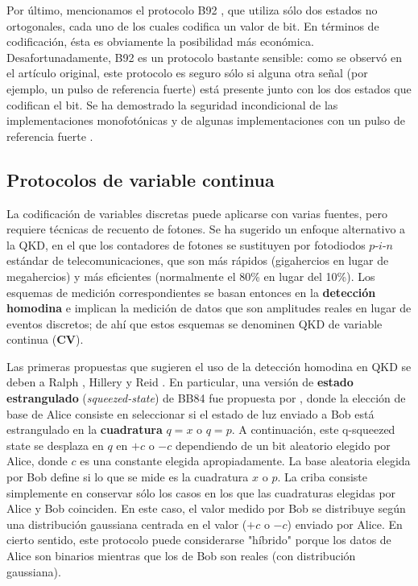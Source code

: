 \documentclass[a4paper,11pt]{book} %
\numberwithin{equation}{chapter}
\begin{document}
Por último, mencionamos el protocolo B92 \cite{bib_B92}, que utiliza sólo dos estados no ortogonales, cada uno de los cuales codifica un valor de bit. En términos de codificación, ésta es obviamente la posibilidad más económica. Desafortunadamente, B92 es un protocolo bastante sensible: como se observó en el artículo original, este protocolo es seguro sólo si alguna otra señal (por ejemplo, un pulso de referencia fuerte) está presente junto con los dos estados que codifican el bit. Se ha demostrado la seguridad incondicional de las implementaciones monofotónicas \cite{bib_B92_proof_1,bib_B92_proof_2} y de algunas implementaciones con un pulso de referencia fuerte \cite{bib_B92_proof_3,bib_B92_proof_4}. 




		\subsection{Protocolos de variable continua} \label{subsec_QKD_continua}
		
La codificación de variables discretas puede aplicarse con varias fuentes, pero requiere técnicas de recuento de fotones. Se ha sugerido un enfoque alternativo a la QKD, en el que los contadores de fotones se sustituyen por fotodiodos $p$-$i$-$n$ estándar de telecomunicaciones, que son más rápidos (gigahercios en lugar de megahercios) y más eficientes (normalmente el 80\% en lugar del 10\%). Los esquemas de medición correspondientes se basan entonces en la \textbf{detección homodina} e implican la medición de datos que son amplitudes reales en lugar de eventos discretos; de ahí que estos esquemas se denominen QKD de variable continua (\textbf{CV}).

Las primeras propuestas que sugieren el uso de la detección homodina en QKD se deben a Ralph \cite{bib_Continue_var_Ralph_1999}, Hillery \cite{bib_Continue_var_Hillery_2000} y Reid \cite{bib_Continue_var_Reid_2000}. En particular, una versión de \textbf{estado estrangulado} (\textit{squeezed-state}) de BB84 fue propuesta por \cite{bib_Continue_var_Hillery_2000}, donde la elección de base de Alice consiste en seleccionar si el estado de luz enviado a Bob está estrangulado en la \textbf{cuadratura} $q = x$ o $q = p$. A continuación, este q-squeezed state se desplaza en $q$ en $+c$ o $-c$ dependiendo de un bit aleatorio elegido por Alice, donde $c$ es una constante elegida apropiadamente. La base aleatoria elegida por Bob define si lo que se mide es la cuadratura $x$ o $p$. La criba consiste simplemente en conservar sólo los casos en los que las cuadraturas elegidas por Alice y Bob coinciden. En este caso, el valor medido por Bob se distribuye según una distribución gaussiana centrada en el valor ($+c$ o $-c$) enviado por Alice. En cierto sentido, este protocolo puede considerarse "híbrido" porque los datos de Alice son binarios mientras que los de Bob son reales (con distribución gaussiana).
\end{document}
